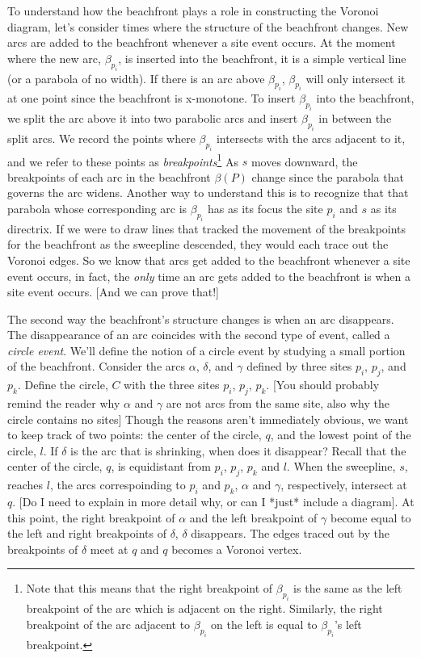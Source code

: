 \documentclass[12pt,twoside]{reedthesis}
\begin{document}
  To understand how the beachfront plays a role in constructing the Voronoi diagram, let's consider times where the structure of the beachfront changes. New arcs are added to the beachfront whenever a site event occurs. At the moment where the new arc, $\beta_{p_{i}}$, is inserted into the beachfront, it is a simple vertical line (or a parabola of no width). If there is an arc above $\beta_{p_{i}}$, $\beta_{p_{i}}$ will only intersect it at one point since the beachfront is x-monotone. To insert $\beta_{p_{i}}$ into the beachfront, we split the arc above it into two parabolic arcs and insert $\beta_{p_{i}}$ in between the split arcs. We record the points where $\beta_{p_{i}}$ intersects with the arcs adjacent to it, and we refer to these points as \emph{breakpoints}\footnote{Note that this means that the right breakpoint of $\beta_{p_{i}}$ is the same as the left breakpoint of the arc which is adjacent on the right. Similarly, the right breakpoint of the arc adjacent to $\beta_{p_{i}}$ on the left is equal to $\beta_{p_{i}}$'s left breakpoint.} As $s$ moves downward, the breakpoints of each arc in the beachfront $\beta(P)$ change since the parabola that governs the arc widens. Another way to understand this is to recognize that that parabola whose corresponding arc is $\beta_{p_{i}}$ has as its focus the site $p_{i}$ and $s$ as its directrix. If we were to draw lines that tracked the movement of the breakpoints for the beachfront as the sweepline descended, they would each trace out the Voronoi edges. So we know that arcs get added to the beachfront whenever a site event occurs, in fact, the \emph{only} time an arc gets added to the beachfront is when a site event occurs. [And we can prove that!] \par
  The second way the beachfront's structure changes is when an arc disappears. The disappearance of an arc coincides with the second type of event, called a \emph{circle event}. We'll define the notion of a circle event by studying a small portion of the beachfront. Consider the arcs $\alpha$, $\delta$, and $\gamma$ defined by three sites $p_{i}$, $p_{j}$, and $p_{k}$. Define the circle, $C$ with the three sites $p_{i}$, $p_{j}$, $p_{k}$. [You should probably remind the reader why $\alpha$ and $\gamma$ are not arcs from the same site, also why the circle contains no sites] Though the reasons aren't immediately obvious, we want to keep track of two points: the center of the circle, $q$, and the lowest point of the circle, $l$. If $\delta$ is the arc that is shrinking, when does it disappear? Recall that the center of the circle, $q$, is equidistant from $p_{i}$, $p_{j}$, $p_{k}$ and $l$. When the sweepline, $s$, reaches $l$, the arcs correspoinding to $p_{i}$ and $p_{k}$, $\alpha$ and $\gamma$, respectively, intersect at $q$. [Do I need to explain in more detail why, or can I *just* include a diagram]. At this point, the right breakpoint of $\alpha$ and the left breakpoint of $\gamma$ become equal to the left and right breakpoints of $\delta$, $\delta$ disappears. The edges traced out by the breakpoints of $\delta$ meet at $q$ and $q$ becomes a Voronoi vertex.\par
\end{document}
